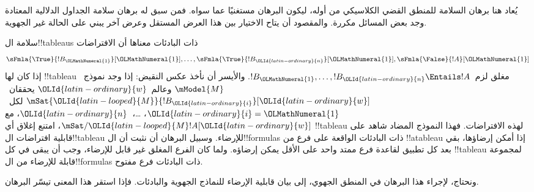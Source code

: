 \documentclass[../../../include/open-logic-section]{subfiles}
\begin{document}


\begin{editorial}
  يُعاد هنا برهان السلامة للمنطق القضي الكلاسيكي من أوله، ليكون البرهان
  مستغنيًا عما سواه. فمن سبق له برهان سلامة الجداول الدلالية المعتادة
  وجد بعض المسائل مكررة. والمقصود أن يتاح الاختيار بين هذا العرض
  المستقل وعرض آخر يبني على الحالة غير الجهوية.
\end{editorial}

\begin{explain}
  سلامة ال!!{tableau}s ذات البادئات معناها أن الافتراضات
  \[
  \sFmla{\True}{!B_{\OLMathNumeral{1}}}[{\OLMathNumeral{1}}], \dots, \sFmla{\True}{!B_{\OLId{latin-ordinary}{n}}}[{\OLMathNumeral{1}}], \sFmla{\False}{!A}[{\OLMathNumeral{1}}]
  \]
  إذا كان لها !!{tableau} مغلق لزم~$!B_{\OLMathNumeral{1}}, \dots, !B_{\OLId{latin-ordinary}{n}} \Entails !A$.
  والأيسر أن نأخذ عكس النقيض: إذا وجد نموذج~$\mModel{M}$ وعالم~${\OLId{latin-ordinary}{w}}$
  يحققان~$\mSat{{\OLId{latin-looped}{M}}}{!B_{\OLId{latin-ordinary}{i}}}[{\OLId{latin-ordinary}{w}}]$ لكل~${\OLId{latin-ordinary}{i}}={\OLMathNumeral{1}}$، \dots،~${\OLId{latin-ordinary}{n}}$، مع
  $\mSat/{{\OLId{latin-looped}{M}}}{!A}[{\OLId{latin-ordinary}{w}}]$، امتنع إغلاق أي !!{tableau} لهذه الافتراضات.
  فهذا النموذج المضاد شاهد على قابلية افتراضات ال!!{tableau} للإرضاء.
  وسبيل البرهان أن نثبت أن ال!!{formula}s ذات البادئات الواقعة على
  فرع من !!a{tableau} إذا أمكن إرضاؤها، بقي بعد كل تطبيق لقاعدة
  فرع ممتد واحد على الأقل يمكن إرضاؤه. ولما كان الفرع المغلق غير قابل
  للإرضاء، وجب أن يبقى في كل !!{tableau} لمجموعة قابلة للإرضاء من
  ال!!{formula}s ذات البادئات فرع مفتوح.

  ونحتاج، لإجراء هذا البرهان في المنطق الجهوي، إلى بيان قابلية الإرضاء
  للنماذج الجهوية والبادئات. فإذا استقر هذا المعنى تيسّر البرهان.
\end{explain}
\end{document}
